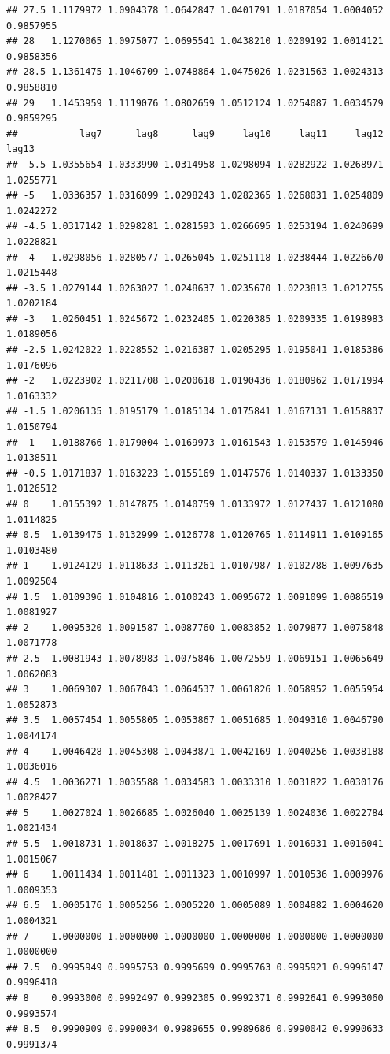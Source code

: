 \documentclass[
]{book}
\begin{document}
\begin{verbatim}
## 27.5 1.1179972 1.0904378 1.0642847 1.0401791 1.0187054 1.0004052 0.9857955
## 28   1.1270065 1.0975077 1.0695541 1.0438210 1.0209192 1.0014121 0.9858356
## 28.5 1.1361475 1.1046709 1.0748864 1.0475026 1.0231563 1.0024313 0.9858810
## 29   1.1453959 1.1119076 1.0802659 1.0512124 1.0254087 1.0034579 0.9859295
##           lag7      lag8      lag9     lag10     lag11     lag12     lag13
## -5.5 1.0355654 1.0333990 1.0314958 1.0298094 1.0282922 1.0268971 1.0255771
## -5   1.0336357 1.0316099 1.0298243 1.0282365 1.0268031 1.0254809 1.0242272
## -4.5 1.0317142 1.0298281 1.0281593 1.0266695 1.0253194 1.0240699 1.0228821
## -4   1.0298056 1.0280577 1.0265045 1.0251118 1.0238444 1.0226670 1.0215448
## -3.5 1.0279144 1.0263027 1.0248637 1.0235670 1.0223813 1.0212755 1.0202184
## -3   1.0260451 1.0245672 1.0232405 1.0220385 1.0209335 1.0198983 1.0189056
## -2.5 1.0242022 1.0228552 1.0216387 1.0205295 1.0195041 1.0185386 1.0176096
## -2   1.0223902 1.0211708 1.0200618 1.0190436 1.0180962 1.0171994 1.0163332
## -1.5 1.0206135 1.0195179 1.0185134 1.0175841 1.0167131 1.0158837 1.0150794
## -1   1.0188766 1.0179004 1.0169973 1.0161543 1.0153579 1.0145946 1.0138511
## -0.5 1.0171837 1.0163223 1.0155169 1.0147576 1.0140337 1.0133350 1.0126512
## 0    1.0155392 1.0147875 1.0140759 1.0133972 1.0127437 1.0121080 1.0114825
## 0.5  1.0139475 1.0132999 1.0126778 1.0120765 1.0114911 1.0109165 1.0103480
## 1    1.0124129 1.0118633 1.0113261 1.0107987 1.0102788 1.0097635 1.0092504
## 1.5  1.0109396 1.0104816 1.0100243 1.0095672 1.0091099 1.0086519 1.0081927
## 2    1.0095320 1.0091587 1.0087760 1.0083852 1.0079877 1.0075848 1.0071778
## 2.5  1.0081943 1.0078983 1.0075846 1.0072559 1.0069151 1.0065649 1.0062083
## 3    1.0069307 1.0067043 1.0064537 1.0061826 1.0058952 1.0055954 1.0052873
## 3.5  1.0057454 1.0055805 1.0053867 1.0051685 1.0049310 1.0046790 1.0044174
## 4    1.0046428 1.0045308 1.0043871 1.0042169 1.0040256 1.0038188 1.0036016
## 4.5  1.0036271 1.0035588 1.0034583 1.0033310 1.0031822 1.0030176 1.0028427
## 5    1.0027024 1.0026685 1.0026040 1.0025139 1.0024036 1.0022784 1.0021434
## 5.5  1.0018731 1.0018637 1.0018275 1.0017691 1.0016931 1.0016041 1.0015067
## 6    1.0011434 1.0011481 1.0011323 1.0010997 1.0010536 1.0009976 1.0009353
## 6.5  1.0005176 1.0005256 1.0005220 1.0005089 1.0004882 1.0004620 1.0004321
## 7    1.0000000 1.0000000 1.0000000 1.0000000 1.0000000 1.0000000 1.0000000
## 7.5  0.9995949 0.9995753 0.9995699 0.9995763 0.9995921 0.9996147 0.9996418
## 8    0.9993000 0.9992497 0.9992305 0.9992371 0.9992641 0.9993060 0.9993574
## 8.5  0.9990909 0.9990034 0.9989655 0.9989686 0.9990042 0.9990633 0.9991374

\end{verbatim}
\end{document}
